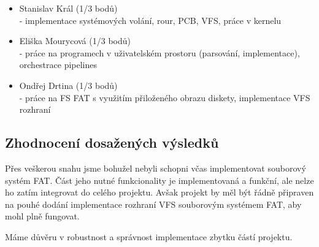 \documentclass[12pt, a4paper]{article}
\begin{document}
\begin{itemize}
	\item Stanislav Král (1/3 bodů)\\
		- implementace systémových volání, rour, PCB, VFS, práce v kernelu
	\item Eliška Mourycová (1/3 bodů) \\
		- práce na programech v uživatelském prostoru (parsování, implementace), orchestrace pipelines
	\item Ondřej Drtina (1/3 bodů) \\
		- práce na FS FAT s využitím přiloženého obrazu diskety, implementace VFS rozhraní
\end{itemize}

\subsection{Zhodnocení dosažených výsledků}
Přes veškerou snahu jsme bohužel nebyli schopni včas implementovat souborový systém FAT. Část jeho nutné funkcionality je implementovaná a funkční, ale nelze ho zatím integrovat do celého projektu. Avšak projekt by měl být řádně připraven na pouhé dodání implementace rozhraní VFS souborovým systémem FAT, aby mohl plně fungovat.

Máme důvěru v robustnost a správnost implementace zbytku částí projektu.
\end{document}

